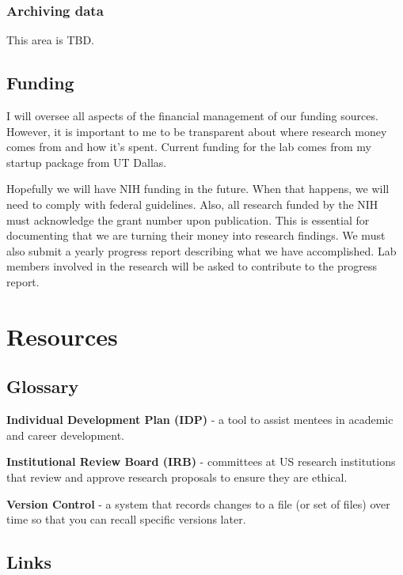 \documentclass[]{book}
\begin{document}
\hypertarget{archiving-data}{%
\subsection{Archiving data}\label{archiving-data}}

This area is TBD.

\hypertarget{funding}{%
\section{Funding}\label{funding}}

I will oversee all aspects of the financial management of our funding sources. However, it is important to me to be transparent about where research money comes from and how it's spent. Current funding for the lab comes from my startup package from UT Dallas.

Hopefully we will have NIH funding in the future. When that happens, we will need to comply with federal guidelines. Also, all research funded by the NIH must acknowledge the grant number upon publication. This is essential for documenting that we are turning their money into research findings. We must also submit a yearly progress report describing what we have accomplished. Lab members involved in the research will be asked to contribute to the progress report.

\hypertarget{resources}{%
\chapter{Resources}\label{resources}}

\hypertarget{glossary}{%
\section{Glossary}\label{glossary}}

\textbf{Individual Development Plan (IDP)} - a tool to assist mentees in academic and career development.

\textbf{Institutional Review Board (IRB)} - committees at US research institutions that review and approve research proposals to ensure they are ethical.

\textbf{Version Control} - a system that records changes to a file (or set of files) over time so that you can recall specific versions later.

\hypertarget{links}{%
\section{Links}\label{links}}
\end{document}
